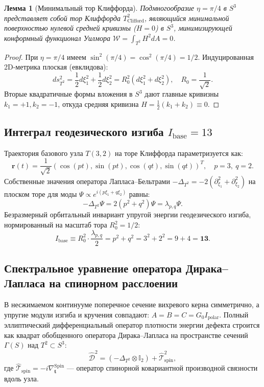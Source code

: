 \documentclass[12pt,a4paper]{article}
\newtheorem{lemma}{Лемма}
\begin{document}
	\begin{lemma}[Минимальный тор Клиффорда]
		Подмногообразие $\eta = \pi/4$ в $S^3$ представляет собой тор Клиффорда $T^2_{\mathrm{Clifford}}$, являющийся минимальной поверхностью нулевой средней кривизны ($H=0$) в $S^3$, минимизирующей конформный функционал Уилмора $\mathcal{W} = \int_{T^2} H^2 dA = 0$.
	\end{lemma}
	
	\begin{proof}
		При $\eta = \pi/4$ имеем $\sin^2(\pi/4) = \cos^2(\pi/4) = 1/2$. Индуцированная 2D-метрика плоская (евклидова):
		\begin{equation}
			ds^2_{T^2} = \frac{1}{2} d\xi_1^2 + \frac{1}{2} d\xi_2^2 = R_0^2 (d\xi_1^2 + d\xi_2^2), \quad R_0 = \frac{1}{\sqrt{2}}.
		\end{equation}
		Вторые квадратичные формы вложения в $S^3$ дают главные кривизны $k_1 = +1, k_2 = -1$, откуда средняя кривизна $H = \frac{1}{2}(k_1 + k_2) \equiv 0$.
	\end{proof}
	
	\subsection{Интеграл геодезического изгиба $I_{\text{base}} = 13$}
	Траектория базового узла $T(3,2)$ на торе Клиффорда параметризуется как:
	\begin{equation}
		\mathbf{r}(t) = \frac{1}{\sqrt{2}} \left( \cos(pt), \sin(pt), \cos(qt), \sin(qt) \right)^T, \quad p=3, \ q=2.
	\end{equation}
	Собственные значения оператора Лапласа--Бельтрами $-\Delta_{T^2} = -2(\partial_{\xi_1}^2 + \partial_{\xi_2}^2)$ на плоском торе для моды $\Psi \propto e^{i(p\xi_1 + q\xi_2)}$ равны:
	\begin{equation}
		-\Delta_{T^2} \Psi = 2 (p^2 + q^2) \Psi = \lambda_{p,q} \Psi.
	\end{equation}
	Безразмерный орбитальный инвариант упругой энергии геодезического изгиба, нормированный на масштаб тора $R_0^2 = 1/2$:
	\begin{equation}
		I_{\text{base}} \equiv R_0^2 \cdot \frac{\lambda_{p,q}}{2} = p^2 + q^2 = 3^2 + 2^2 = 9 + 4 = \mathbf{13}.
	\end{equation}
	
	\subsection{Спектральное уравнение оператора Дирака--Лапласа на спинорном расслоении}
	В несжимаемом континууме поперечное сечение вихревого керна симметрично, а упругие модули изгиба и кручения совпадают: $A = B = C = G_0 I_{\text{polar}}$. Полный эллиптический дифференциальный оператор плотности энергии дефекта строится как квадрат обобщенного оператора Дирака--Лапласа на пространстве сечений $\Gamma(S)$ над $T^2 \subset S^3$:
	\begin{equation}
		\hat{\mathcal{D}}^2 = \left( -\Delta_{T^2} \otimes \mathbb{I}_2 \right) + \hat{\mathcal{T}}_{\text{spin}}^2,
	\end{equation}
	где $\hat{\mathcal{T}}_{\text{spin}} = -i \nabla_{\mathbf{t}}^{\mathrm{Spin}}$ --- оператор спинорной ковариантной производной связности вдоль узла.
	
\end{document}
